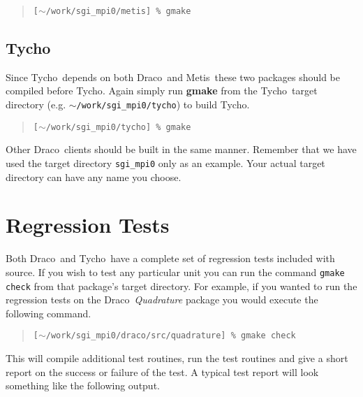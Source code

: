 \documentclass[10pt]{nmemo}
\newcommand{\comp}[1]{\normalfont\normalsize\texttt{#1}}
\newcommand{\draco}{{\normalfont\sffamily Draco}}
\newcommand{\tycho}{{\normalfont\sffamily Tycho}}
\newcommand{\metis}{{\normalfont\sffamily Metis}}
\begin{document}
\footnotesize
\begin{verse}
\texttt{[$\sim$/work/sgi\_mpi0/metis] \% gmake}
\end{verse}
\normalsize

\subsection{\tycho}

Since \tycho\ depends on both \draco\ and \metis\ these two packages
should be compiled before \tycho.  Again simply run \textbf{gmake}
from the \tycho\ target directory (e.g. \comp{$\sim$/work/sgi\_mpi0/tycho})
to build \tycho.

\footnotesize
\begin{verse}
\texttt{[$\sim$/work/sgi\_mpi0/tycho] \% gmake}
\end{verse}
\normalsize

Other \draco\ clients should be built in the same manner.  Remember
that we have used the target directory \comp{sgi\_mpi0} only as an
example.  Your actual target directory can have any name you choose.


\section{Regression Tests}
\label{regression}

Both \draco\ and \tycho\ have a complete set of regression tests
included with source.  If you wish to test any particular unit you can
run the command \comp{gmake check} from that package's target
directory.  For example, if you wanted to run the regression tests on
the \draco\ \emph{Quadrature} package you would execute the following
command.

\footnotesize
\begin{verse}
\texttt{[$\sim$/work/sgi\_mpi0/draco/src/quadrature] \% gmake check}
\end{verse}
\normalsize

This will compile additional test routines, run the test routines
and give a short report on the success or failure of the test.  A
typical test report will look something like the following output.
\end{document}
